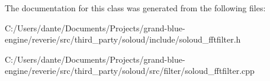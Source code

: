 The documentation for this class was generated from the following files\+:\begin{DoxyCompactItemize}
\item 
C\+:/\+Users/dante/\+Documents/\+Projects/grand-\/blue-\/engine/reverie/src/third\+\_\+party/soloud/include/soloud\+\_\+fftfilter.\+h\item 
C\+:/\+Users/dante/\+Documents/\+Projects/grand-\/blue-\/engine/reverie/src/third\+\_\+party/soloud/src/filter/soloud\+\_\+fftfilter.\+cpp\end{DoxyCompactItemize}
